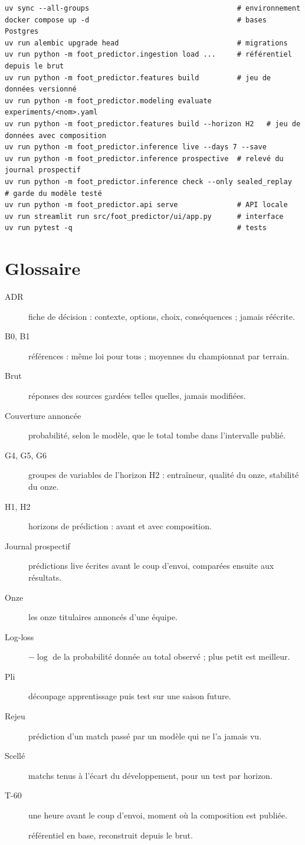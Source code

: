 {\small
\begin{verbatim}
uv sync --all-groups                                   # environnement
docker compose up -d                                   # bases Postgres
uv run alembic upgrade head                            # migrations
uv run python -m foot_predictor.ingestion load ...     # référentiel depuis le brut
uv run python -m foot_predictor.features build         # jeu de données versionné
uv run python -m foot_predictor.modeling evaluate experiments/<nom>.yaml
uv run python -m foot_predictor.features build --horizon H2   # jeu de données avec composition
uv run python -m foot_predictor.inference live --days 7 --save
uv run python -m foot_predictor.inference prospective  # relevé du journal prospectif
uv run python -m foot_predictor.inference check --only sealed_replay   # garde du modèle testé
uv run python -m foot_predictor.api serve              # API locale
uv run streamlit run src/foot_predictor/ui/app.py      # interface
uv run pytest -q                                       # tests
\end{verbatim}
}

\section{Glossaire}

\begin{description}
  \item[ADR] fiche de décision : contexte, options, choix, conséquences ; jamais réécrite.
  \item[B0, B1] références : même loi pour tous ; moyennes du championnat par terrain.
  \item[Brut] réponses des sources gardées telles quelles, jamais modifiées.
  \item[Couverture annoncée] probabilité, selon le modèle, que le total tombe dans l'intervalle publié.
  \item[G4, G5, G6] groupes de variables de l'horizon H2 : entraîneur, qualité du onze, stabilité du onze.
  \item[H1, H2] horizons de prédiction : avant et avec composition.
  \item[Journal prospectif] prédictions live écrites avant le coup d'envoi, comparées ensuite aux résultats.
  \item[Onze] les onze titulaires annoncés d'une équipe.
  \item[Log-loss] \(-\log\) de la probabilité donnée au total observé ; plus petit est meilleur.
  \item[Pli] découpage apprentissage puis test sur une saison future.
  \item[Rejeu] prédiction d'un match passé par un modèle qui ne l'a jamais vu.
  \item[Scellé] matchs tenus à l'écart du développement, pour un test par horizon.
  \item[T-60] une heure avant le coup d'envoi, moment où la composition est publiée.
  \item[] référentiel en base, reconstruit depuis le brut.
\end{description}
